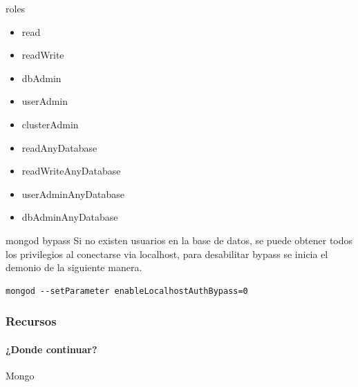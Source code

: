 \documentclass[12pt]{beamer}
\begin{document}
\begin{frame}[fragile]{roles}
\begin{multicols}{2}

  \begin{itemize}
    \item read

    \item readWrite

    \item dbAdmin

    \item userAdmin

    \item clusterAdmin

    \item readAnyDatabase

    \item readWriteAnyDatabase

    \item userAdminAnyDatabase

    \item dbAdminAnyDatabase
    
  \end{itemize}
\end{multicols}
\end{frame}


\begin{frame}[fragile]{mongod bypass}
Si no existen usuarios en la base de datos, se puede obtener todos los
privilegios al conectarse via localhost, para desabilitar bypass se inicia el
demonio de la siguiente manera.

\begin{verbatim}
mongod --setParameter enableLocalhostAuthBypass=0
\end{verbatim}
\end{frame}


\newcommand{\putlink}[1]{%
   \pgfsetlinewidth{1.4pt}%
   \pgfsetendarrow{\pgfarrowtriangle{4pt}}%
   \pgfline{\pgfxy(1,1)}{\pgfxy(#1,1)}
}


\begin{frame}
  \frametitle{Recursos}
  \framesubtitle{¿Donde continuar?}
  \begin{thebibliography}{10}

  \beamertemplatearticlebibitems

    Mongo


  \end{thebibliography}
\end{frame}

\end{document}
